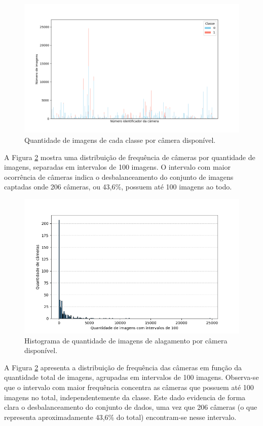 \begin{figure}[htb]
    \centerline{\includegraphics[width=1\linewidth]{images/totalcount_code.png}}
    \caption{Quantidade de imagens de cada classe por câmera disponível.}
    \label{fig:totalcount}
\end{figure}

A Figura \ref{fig:histcodes} mostra uma distribuição de frequência de câmeras por quantidade de imagens, separadas em intervalos de 100 imagens.
O intervalo com maior ocorrência de câmeras indica o desbalanceamento do conjunto de imagens captadas onde 206 câmeras, ou 43,6\%, possuem até 100 imagens ao todo. 

\begin{figure}[htb]
    \centerline{\includegraphics[width=1\linewidth]{images/metodologia/histcodes.png}}
    \caption{Histograma de quantidade de imagens de alagamento por câmera disponível.}
    \label{fig:histcodes}
\end{figure}

A Figura \ref{fig:histcodes} apresenta a distribuição de frequência das câmeras em função da quantidade total de imagens, agrupadas em intervalos de 100 imagens.
Observa-se que o intervalo com maior frequência concentra as câmeras que possuem até 100 imagens no total, independentemente da classe.
Este dado evidencia de forma clara o desbalanceamento do conjunto de dados, uma vez que 206 câmeras (o que representa aproximadamente 43,6\% do total) encontram-se nesse intervalo.

